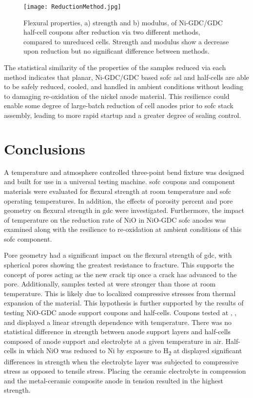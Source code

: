 \begin{figure}
    \texttt{[image: ReductionMethod.jpg]}
    \caption{Flexural properties, a) strength and b) modulus, of Ni-GDC/GDC half-cell coupons after reduction via two different methods, compared to unreduced cells. Strength and modulus show a decrease upon reduction but no significant difference between methods.}
    \label{fig:reductionmethod}
\end{figure}

The statistical similarity of the properties of the samples reduced via each method indicates that planar, Ni-GDC/GDC based \gls{sofc} \gls{asl} and half-cells are able to be safely reduced, cooled, and handled in ambient conditions without leading to damaging re-oxidation of the nickel anode material.
This resilience could enable some degree of large-batch reduction of cell anodes prior to \gls{sofc} stack assembly, leading to more rapid startup and a greater degree of sealing control.

\section{Conclusions}

A temperature and atmosphere controlled three-point bend fixture was designed and built for use in a universal testing machine.
\gls{sofc} coupons and component materials were evaluated for flexural strength at room temperature and \gls{sofc} operating temperatures.
In addition, the effects of porosity percent and pore geometry on flexural strength in \gls{gdc} were investigated.
Furthermore, the impact of temperature on the reduction rate of NiO in NiO-GDC \gls{sofc} anodes was examined along with the resilience to re-oxidation at ambient conditions of this \gls{sofc} component.

Pore geometry had a significant impact on the flexural strength of
\Gls{gdc}, with spherical pores showing the greatest resistance to fracture.
This supports the concept of pores acting as the new crack tip once a crack has advanced to the pore.
Additionally, samples tested at  were stronger than those at room temperature.
This is likely due to localized compressive stresses from thermal expansion of the material.
This hypothesis is further supported by the results of testing NiO-GDC
anode support coupons and half-cells.
Coupons tested at , , and  displayed a linear strength dependence with temperature.
There was no statistical difference in strength between anode support layers and half-cells composed of anode support and electrolyte at a given temperature in air.
Half-cells in which NiO was reduced to Ni by exposure to H\textsubscript{2} at  displayed significant differences in strength when the electrolyte layer was subjected to compressive stress as opposed to tensile stress.
Placing the ceramic electrolyte in compression and the metal-ceramic composite anode in tension resulted in the highest strength.

